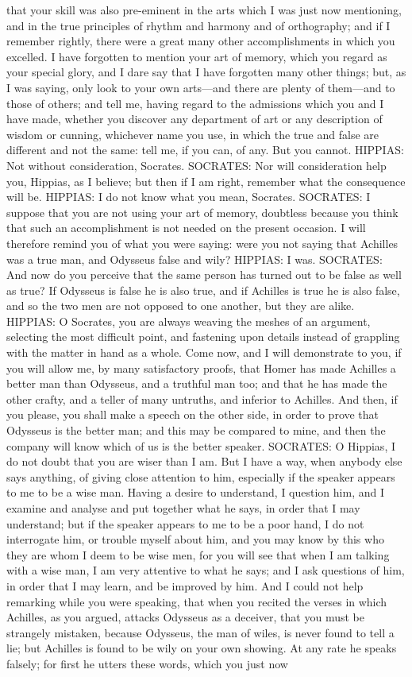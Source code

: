 \documentclass[11pt,letter]{article}
\begin{document}
that your skill was also pre-eminent in the arts which I was just now mentioning, and in the true principles of rhythm and harmony and of orthography; and if I remember rightly, there were a great many other accomplishments in which you excelled. I have forgotten to mention your art of memory, which you regard as your special glory, and I dare say that I have forgotten many other things; but, as I was saying, only look to your own arts—and there are plenty of them—and to those of others; and tell me, having regard to the admissions which you and I have made, whether you discover any department of art or any description of wisdom or cunning, whichever name you use, in which the true and false are different and not the same:  tell me, if you can, of any. But you cannot. HIPPIAS:  Not without consideration, Socrates. SOCRATES:  Nor will consideration help you, Hippias, as I believe; but then if I am right, remember what the consequence will be. HIPPIAS:  I do not know what you mean, Socrates. SOCRATES:  I suppose that you are not using your art of memory, doubtless because you think that such an accomplishment is not needed on the present occasion. I will therefore remind you of what you were saying:  were you not saying that Achilles was a true man, and Odysseus false and wily? HIPPIAS:  I was. SOCRATES:  And now do you perceive that the same person has turned out to be false as well as true? If Odysseus is false he is also true, and if Achilles is true he is also false, and so the two men are not opposed to one another, but they are alike. HIPPIAS:  O Socrates, you are always weaving the meshes of an argument, selecting the most difficult point, and fastening upon details instead of grappling with the matter in hand as a whole. Come now, and I will demonstrate to you, if you will allow me, by many satisfactory proofs, that Homer has made Achilles a better man than Odysseus, and a truthful man too; and that he has made the other crafty, and a teller of many untruths, and inferior to Achilles. And then, if you please, you shall make a speech on the other side, in order to prove that Odysseus is the better man; and this may be compared to mine, and then the company will know which of us is the better speaker. SOCRATES:  O Hippias, I do not doubt that you are wiser than I am. But I have a way, when anybody else says anything, of giving close attention to him, especially if the speaker appears to me to be a wise man. Having a desire to understand, I question him, and I examine and analyse and put together what he says, in order that I may understand; but if the speaker appears to me to be a poor hand, I do not interrogate him, or trouble myself about him, and you may know by this who they are whom I deem to be wise men, for you will see that when I am talking with a wise man, I am very attentive to what he says; and I ask questions of him, in order that I may learn, and be improved by him. And I could not help remarking while you were speaking, that when you recited the verses in which Achilles, as you argued, attacks Odysseus as a deceiver, that you must be strangely mistaken, because Odysseus, the man of wiles, is never found to tell a lie; but Achilles is found to be wily on your own showing. At any rate he speaks falsely; for first he utters these words, which you just now 
\end{document}
